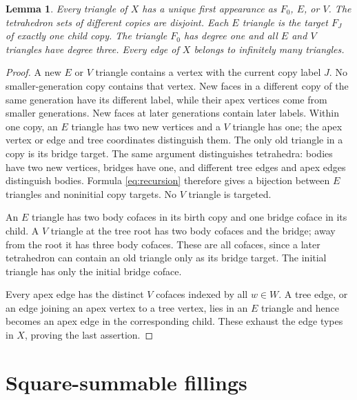 \documentclass[11pt]{article}
\newtheorem{lemma}[theorem]{Lemma}
\begin{document}
\begin{lemma}\label{lem:degrees}
Every triangle of $X$ has a unique first appearance as $F_0$, $E$, or $V$.
The tetrahedron sets of different copies are disjoint. Each $E$ triangle is
the target $F_J$ of exactly one child copy. The triangle $F_0$ has degree one
and all $E$ and $V$ triangles have degree three. Every edge of $X$ belongs to
infinitely many triangles.
\end{lemma}
\begin{proof}
A new $E$ or $V$ triangle contains a vertex with the current copy label $J$.
No smaller-generation copy contains that vertex. New faces in a different
copy of the same generation have its different label, while their apex
vertices come from smaller generations. New faces at later generations
contain later labels. Within one copy, an $E$ triangle has two new vertices
and a $V$ triangle has one; the apex vertex or edge and tree coordinates
distinguish them. The only old triangle in a copy is its bridge target.
The same argument distinguishes tetrahedra: bodies have two new vertices,
bridges have one, and different tree edges and apex edges distinguish bodies.
Formula \eqref{eq:recursion} therefore gives a bijection between $E$
triangles and noninitial copy targets. No $V$ triangle is targeted.

An $E$ triangle has two body cofaces in its birth copy and one bridge coface
in its child. A $V$ triangle at the tree root has two body cofaces and the
bridge; away from the root it has three body cofaces. These are all cofaces,
since a later tetrahedron can contain an old triangle only as its bridge
target. The initial triangle has only the initial bridge coface.

Every apex edge has the distinct $V$ cofaces indexed by all $w\in W$.
A tree edge, or an edge joining an apex vertex to a tree vertex, lies in an
$E$ triangle and hence becomes an apex edge in the corresponding child.
These exhaust the edge types in $X$, proving the last assertion.
\end{proof}

\section{Square-summable fillings}\label{sec:fillings}
\end{document}
